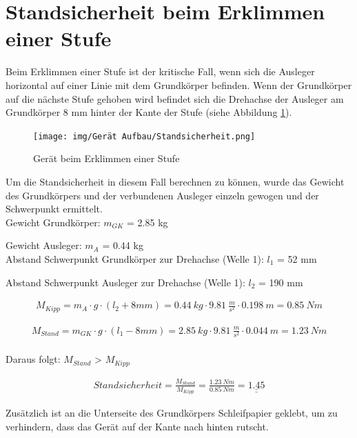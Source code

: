 \newpage

\section{Standsicherheit beim Erklimmen einer Stufe}

Beim Erklimmen einer Stufe ist der kritische Fall, wenn sich die Ausleger horizontal auf einer Linie mit dem Grundkörper befinden. Wenn der Grundkörper auf die nächste Stufe gehoben wird befindet sich die Drehachse der Ausleger am Grundkörper 8 mm hinter der Kante der Stufe (siehe Abbildung \ref{fig:Erklimmen}).

\begin{figure}[h]
  \texttt{[image: img/Gerät Aufbau/Standsicherheit.png]}
  \centering
  \caption{Gerät beim Erklimmen einer Stufe}
  \label{fig:Erklimmen}
\end{figure}

Um die Standsicherheit in diesem Fall berechnen zu können, wurde das Gewicht des Grundkörpers und der verbundenen Ausleger einzeln gewogen und der Schwerpunkt ermittelt.\\

Gewicht Grundkörper: $m_{GK}$ = 2.85 kg

Gewicht Ausleger: $m_{A}$ = 0.44 kg\\

Abstand Schwerpunkt Grundkörper zur Drehachse (Welle 1): $l_{1}$ = 52 mm

Abstand Schwerpunkt Ausleger zur Drehachse (Welle 1): $l_{2}$ = 190 mm

\newpage

\begin{align*}
M_{Kipp} = m_{A} \cdot g \cdot (l_{2}+8 mm) = 0.44\ kg \cdot 9.81\ \frac{m}{s^2} \cdot 0.198\ m = 0.85\ Nm
\end{align*}

\begin{align*}
M_{Stand} = m_{GK} \cdot g \cdot (l_{1}-8 mm) = 2.85\ kg \cdot 9.81\ \frac{m}{s^2} \cdot 0.044\ m = 1.23\ Nm
\end{align*}\\

Daraus folgt: $M_{Stand}$ > $M_{Kipp}$

\begin{align*}
Standsicherheit = \frac{M_{Stand}}{M_{Kipp}} = \frac{1.23\ Nm}{0.85\ Nm} = \underline{\underline{1.45}}
\end{align*}

Zusätzlich ist an die Unterseite des Grundkörpers Schleifpapier geklebt, um zu verhindern, dass das Gerät auf der Kante nach hinten rutscht.


